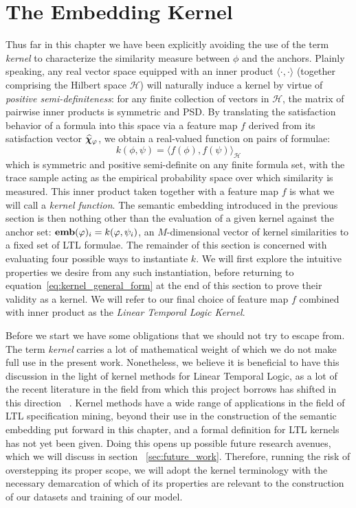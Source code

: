\documentclass[titlepage,a4paper,11pt]{report}
\begin{document}
    \section{The Embedding Kernel}\label{sec:the_embedding_kernel}
    Thus far in this chapter we have been explicitly avoiding the use of the term \emph{kernel} to characterize the similarity measure between $\phi$ and the anchors. Plainly speaking, any real vector space equipped with an inner product $\langle \cdot, \cdot \rangle$ (together comprising the Hilbert space $\mathcal{H}$) will naturally induce a kernel by virtue of \emph{positive semi-definiteness}: for any finite collection of vectors in $\mathcal{H}$, the matrix of pairwise inner products is symmetric and PSD. By translating the satisfaction behavior of a formula into this space via a feature map $f$ derived from its satisfaction vector $\bm{\widehat\chi}_\varphi$, we obtain a real-valued function on pairs of formulae:
    \begin{equation} \label{eq:kernel_general_form}
        k(\phi, \psi) = \bigl\langle f(\phi), f(\psi)\bigr\rangle_\mathcal{H}
    \end{equation}
    which is symmetric and positive semi-definite on any finite formula set, with the trace sample acting as the empirical probability space over which similarity is measured. This inner product taken together with a feature map $f$ is what we will call a \textit{kernel function}. The semantic embedding introduced in the previous section is then nothing other than the evaluation of a given kernel against the anchor set: $\textbf{emb}(\varphi)_i = k(\varphi, \psi_i)$, an $M$-dimensional vector of kernel similarities to a fixed set of LTL formulae. The remainder of this section is concerned with evaluating four possible ways to instantiate $k$. We will first explore the intuitive properties we desire from any such instantiation, before returning to equation~\ref{eq:kernel_general_form} at the end of this section to prove their validity as a kernel. We will refer to our final choice of feature map $f$ combined with inner product as the \emph{Linear Temporal Logic Kernel}.
    
    Before we start we have some obligations that we should not try to escape from. The term \emph{kernel} carries a lot of mathematical weight of which we do not make full use in the present work. Nonetheless, we believe it is beneficial to have this discussion in the light of kernel methods for Linear Temporal Logic, as a lot of the recent literature in the field from which this project borrows has shifted in this direction ~\citep{bortolussi_kernel_2020,bortolussi_learning_2022,candussio_bridging_2025,saveri_stl2vec_2024}. Kernel methods have a wide range of applications in the field of LTL specification mining, beyond their use in the construction of the semantic embedding put forward in this chapter, and a formal definition for LTL kernels has not yet been given. Doing this opens up possible future research avenues, which we will discuss in section ~\ref{sec:future_work}. Therefore, running the risk of overstepping its proper scope, we will adopt the kernel terminology with the necessary demarcation of which of its properties are relevant to the construction of our datasets and training of our model. 
\end{document}
